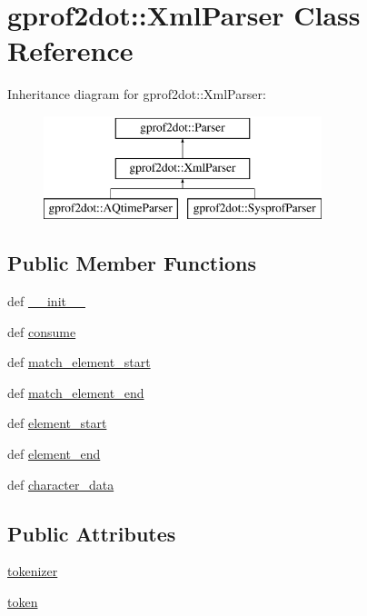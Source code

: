 \hypertarget{classgprof2dot_1_1XmlParser}{
\section{gprof2dot::XmlParser Class Reference}
\label{classgprof2dot_1_1XmlParser}
}
Inheritance diagram for gprof2dot::XmlParser:\begin{figure}[H]
\begin{center}
\leavevmode
\includegraphics[height=3.000000cm]{classgprof2dot_1_1XmlParser}
\end{center}
\end{figure}
\subsection*{Public Member Functions}
\begin{DoxyCompactItemize}
\item 
def \hyperlink{classgprof2dot_1_1XmlParser_ac3307ca05e7e17b5b6a2b96e9782107e}{\_\-\_\-init\_\-\_\-}
\item 
def \hyperlink{classgprof2dot_1_1XmlParser_a3755f6ef42c3461d926ed78ec37ad1cb}{consume}
\item 
def \hyperlink{classgprof2dot_1_1XmlParser_a8f1de7b34709b190ee1fefa004be09f1}{match\_\-element\_\-start}
\item 
def \hyperlink{classgprof2dot_1_1XmlParser_a1f93debd5767a56ce359af7c0f9fb650}{match\_\-element\_\-end}
\item 
def \hyperlink{classgprof2dot_1_1XmlParser_a66b18e1ab93bd5a41e74a9eb9de17140}{element\_\-start}
\item 
def \hyperlink{classgprof2dot_1_1XmlParser_ac2a0a4aee58f3a4b302c005471f72b70}{element\_\-end}
\item 
def \hyperlink{classgprof2dot_1_1XmlParser_aba9557b2e5d26341f3696e789bf144fa}{character\_\-data}
\end{DoxyCompactItemize}
\subsection*{Public Attributes}
\begin{DoxyCompactItemize}
\item 
\hyperlink{classgprof2dot_1_1XmlParser_abb3dc2a67ab6387d51e7ba4eab7cf0e7}{tokenizer}
\item 
\hyperlink{classgprof2dot_1_1XmlParser_acf98651b1e43cc4bdc6804a79d0b35d5}{token}
\end{DoxyCompactItemize}


